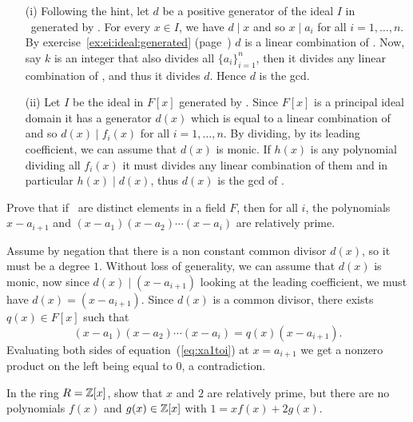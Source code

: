 \begin{myenumerate}
\begin{itemize}
 \item[(i)]
   Following the hint, let $d$ be a positive generator of the
   ideal $I$ in \Z\  generated by \seqan.
   For every \(x\in I\), we have \(d\mid x\)
   and so \(x\mid a_i\) for all \(i=1,\ldots,n\).
   By exercise~\ref{ex:ei:ideal:generated} (page~\pageref{ex:ideal:generated})
   $d$ is a linear combination of \seqan. Now, say $k$ is an integer
   that also divides all \(\{a_i\}_{i=1}^n\), then it divides any
   linear combination of \seqan, and thus it divides $d$. Hence
   $d$ is the gcd.
 \item[(ii)]
   Let $I$ be the ideal in \(F[x]\) generated by .
   Since \(F[x]\) is a principal ideal domain it has a generator
   \(d(x)\) which is equal to a linear combination of 
   and so \(d(x)\mid f_i(x)\) for all \(i=1,\ldots,n\).
   By dividing, by its leading coefficient, we can assume that \(d(x)\)
   is monic.
   If \(h(x)\) is any polynomial dividing all \(f_i(x)\)
   it must divides any linear combination of them and in particular
   \(h(x)\mid d(x)\), thus \(d(x)\) is the gcd of .
\end{itemize}


\item
\begin{excopy}
Prove that if \seqan\ are distinct elements in a field $F$, then for all $i$,
the polynomials \(x-a_{i+1}\) and \((x-a_1)(x-a_2)\cdots(x-a_i)\)
are relatively prime.
\end{excopy}

Assume by negation that there is a non constant common divisor \(d(x)\),
so it must be a degree $1$. Without loss of generality,
we can assume that \(d(x)\) is monic, now since
\(d(x)\mid (x-a_{i+1})\) looking at the leading coefficient,
we must have \(d(x) = (x-a_{i+1})\).
Since \(d(x)\) is a common divisor, there exists \(q(x)\in F[x]\)
such that
\begin{equation} \label{eq:xa1toi}
(x-a_1)(x-a_2)\cdots(x-a_i) = q(x)(x-a_{i+1}).
\end{equation}
Evaluating both sides of equation~(\ref{eq:xa1toi})
at \(x=a_{i+1}\) we get a nonzero product on the left
being equal to $0$, a contradiction.

\item
\begin{excopy}
In the ring \(R=\mathbb{Z}[x]\), show that $x$ and $2$ are relatively prime,
but there are no polynomials \(f(x)\) and \(g(x)\in \mathbb{Z}[x]\) with
\(1=xf(x)+2g(x)\).
\end{excopy}


\end{myenumerate}

